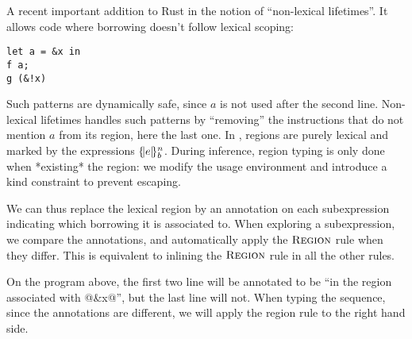A recent important addition to Rust in the notion of ``non-lexical lifetimes''.
It allows code where borrowing doesn't follow
lexical scoping:

\begin{lstlisting}
let a = &x in
f a;
g (&!x)
\end{lstlisting}

Such patterns are dynamically safe, since $a$ is not used after
the second line.
Non-lexical lifetimes handles such patterns by ``removing'' the instructions
that do not mention $a$ from its region, here the last one.
%
In \lang, regions are purely lexical and marked by the
expressions $\region{b}{e}$.
During inference, region typing is only done when *existing* the region:
we modify the usage environment and introduce a kind constraint to prevent
escaping.

We can thus replace the lexical region by
an annotation on each subexpression indicating which borrowing it is associated
to. When exploring a subexpression, we compare the annotations, and automatically
apply the $\textsc{Region}$ rule when they differ.
%
This is equivalent to inlining the $\textsc{Region}$ rule in all the other
rules.

On the program above, the first two line will be annotated
to be ``in the region associated with @&x@'', but the last line will not.
When typing the sequence, since the annotations are different, we will apply
the region rule to the right hand side.

\lstDeleteShortInline@

